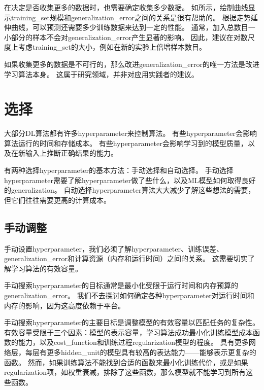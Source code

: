 在决定是否收集更多的数据时，也需要确定收集多少数据。
如所示，绘制曲线显示\gls{training_set}规模和\gls{generalization_error}之间的关系是很有帮助的。
根据走势延伸曲线，可以预测还需要多少训练数据来达到一定的性能。
通常，加入总数目一小部分的样本不会对\gls{generalization_error}产生显著的影响。
因此，建议在对数尺度上考虑\gls{training_set}的大小，例如在新的实验上倍增样本数目。

如果收集更多的数据是不可行的，那么改进\gls{generalization_error}的唯一方法是改进学习算法本身。
这属于研究领域，并非对应用实践者的建议。

\section{选择}
\label{sec:selecting_hyperparameters}
大部分\gls{DL}算法都有许多\gls{hyperparameter}来控制算法。
有些\gls{hyperparameter}会影响算法运行的时间和存储成本。
有些\gls{hyperparameter}会影响学习到的模型质量，以及在新输入上推断正确结果的能力。


有两种选择\gls{hyperparameter}的基本方法：手动选择和自动选择。
手动选择\gls{hyperparameter}需要了解\gls{hyperparameter}做了些什么，以及\gls{ML}模型如何取得良好的\gls{generalization}。
自动选择\gls{hyperparameter}算法大大减少了解这些想法的需要，但它们往往需要更高的计算成本。

\subsection{手动调整}
\label{sec:manual_hyperparameter_tuning}
手动设置\gls{hyperparameter}，我们必须了解\gls{hyperparameter}、训练误差、\gls{generalization_error}和计算资源（内存和运行时间）之间的关系。
这需要切实了解学习算法的有效容量。

手动搜索\gls{hyperparameter}的目标通常是最小化受限于运行时间和内存预算的\gls{generalization_error}。
我们不去探讨如何确定各种\gls{hyperparameter}对运行时间和内存的影响，因为这高度依赖于平台。

手动搜索\gls{hyperparameter}的主要目标是调整模型的有效容量以匹配任务的复杂性。
有效容量受限于三个因素：模型的表示容量，学习算法成功最小化训练模型成本函数的能力，以及\gls{cost_function}和训练过程\gls{regularization}模型的程度。
具有更多网络层，每层有更多\gls{hidden_unit}的模型具有较高的表达能力——能够表示更复杂的函数。
然而，如果训练算法不能找到合适的函数来最小化训练代价，或是如果\gls{regularization}项，如权重衰减，排除了这些函数，那么模型就不能学习到所有这些函数。

